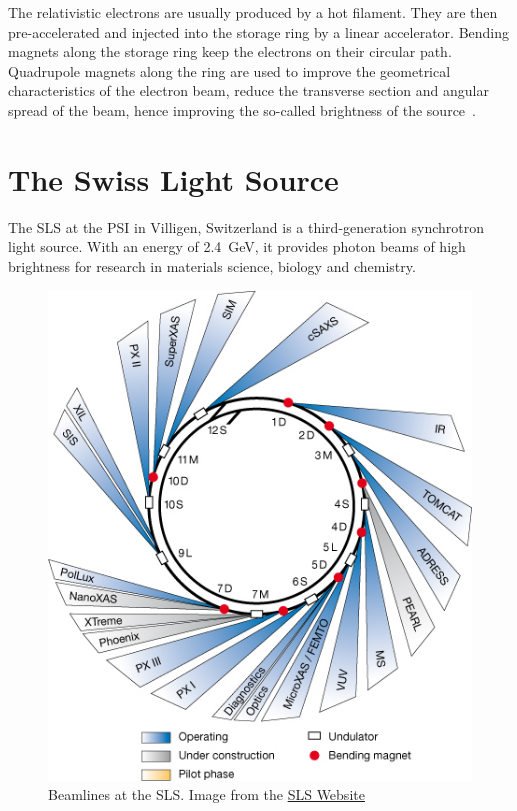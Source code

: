 The relativistic electrons are usually produced by a hot filament. They are then pre-accelerated and injected into the storage ring by a linear accelerator. Bending magnets along the storage ring keep the electrons on their circular path. Quadrupole magnets along the ring are used to improve the geometrical characteristics of the electron beam, \ie reduce the transverse section and angular spread of the beam, hence improving the so-called brightness of the source~\cite{Margaritondo2002}.

\section{The Swiss Light Source}
The \ac{SLS} at the \ac{PSI} in Villigen, Switzerland is a third-generation synchrotron light source. With an energy of \SI{2.4}{\giga\electronvolt}, it provides photon beams of high brightness for research in materials science, biology and chemistry.

\renewcommand{\imsize}{0.618\linewidth}%
\begin{figure}[htb]
	\centering
	\includegraphics[width=\imsize]{img/SLS_beamlines_2008}
	\caption[Beamlines at the Swiss Light Source]{Beamlines at the \ac{SLS}. Image from the \href{http://sls.web.psi.ch/view.php/beamlines/}{SLS Website}}
	\label{fig:beamlines}
\end{figure}

